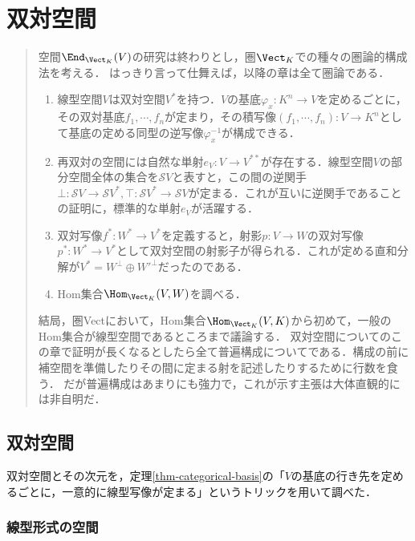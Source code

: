 \documentclass[uplatex, dvipdfmx]{jsreport}
\begin{document}
\chapter{双対空間}

\begin{quotation}
    空間$\End_{\Vect_K}(V)$の研究は終わりとし，圏$\Vect_K$での種々の圏論的構成法を考える．
    はっきり言って仕舞えば，以降の章は全て圏論である．
    \begin{enumerate}
        \item 線型空間$V$は双対空間$V^*$を持つ．$V$の基底$\varphi_x:K^n\to V$を定めるごとに，その双対基底$f_1,\cdots,f_n$が定まり，その積写像$(f_1,\cdots,f_n):V\to K^n$として基底の定める同型の逆写像$\varphi_x^{-1}$が構成できる．
        \item 再双対の空間には自然な単射$e_V:V\to V^{**}$が存在する．線型空間$V$の部分空間全体の集合を$\mathcal{S}V$と表すと，この間の逆関手$\bot:\mathcal{S}V\to\mathcal{S}V^*,\top:\mathcal{S}V^*\to\mathcal{S}V$が定まる．これが互いに逆関手であることの証明に，標準的な単射$e_V$が活躍する．
        \item 双対写像$f^*:W^*\to V^*$を定義すると，射影$p:V\to W$の双対写像$p^*:W^*\to V^*$として双対空間の射影子が得られる．これが定める直和分解が$V^*=W^\bot\oplus W'^\bot$だったのである．
        \item Hom集合$\Hom_{\Vect_K}(V,W)$を調べる．
    \end{enumerate}
    結局，圏Vectにおいて，Hom集合$\Hom_{\Vect_K}(V,K)$から初めて，一般のHom集合が線型空間であるところまで議論する．
    双対空間についてのこの章で証明が長くなるとしたら全て普遍構成についてである．構成の前に補空間を準備したりその間に定まる射を記述したりするために行数を食う．
    だが普遍構成はあまりにも強力で，これが示す主張は大体直観的には非自明だ．
\end{quotation}

\section{双対空間}

\begin{tcolorbox}[colframe=ForestGreen, colback=ForestGreen!10!white, breakable]
    双対空間とその次元を，定理\ref{thm-categorical-basis}の「$V$の基底の行き先を定めるごとに，一意的に線型写像が定まる」というトリックを用いて調べた．
\end{tcolorbox}

\subsection{線型形式の空間}
\end{document}
